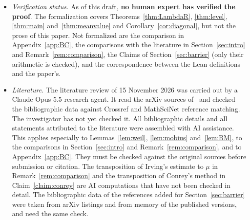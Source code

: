 \documentclass[11pt]{amsart}
\theoremstyle{definition}
\theoremstyle{remark}
\numberwithin{equation}{section}
\begin{document}
\begin{itemize}
November 2026, and \texttt{Barrier.lean} by Claude Fable 5.2 on the same
day; all of it is checked by the Lean kernel.  It imports Lean Pool and
PNT+.  Lean Pool's Kloosterman--Weil development states that generative AI
contributed substantially to it.  Machine checking guarantees that the
formal theorem follows from the formal definitions.  It does not guarantee
that those definitions match the mathematics; that correspondence still
requires human review.
\item \emph{Verification status.}  As of this draft, \textbf{no human
expert has verified the proof}.  The formalization covers
Theorems~\ref{thm:LambdaR}, \ref{thm:level}, \ref{thm:main}
and~\ref{thm:meanvalue} and Corollary~\ref{cor:diagonal}, but not the prose
of this paper.  Not formalized are the comparison in
Appendix~\ref{app:BC}, the comparisons with the literature in
Section~\ref{sec:intro} and Remark~\ref{rem:comparison}, the Claims of
Section~\ref{sec:barrier} (only their arithmetic is checked), and the
correspondence between the Lean definitions and the paper's.
\item \emph{Literature.}  The literature review of 15 November 2026 was
carried out by a Claude Opus 5.5 research agent.  It read the arXiv sources
of~\cite{Walker,Irv14,BCR,PR18,FR22} and checked the bibliographic data
against Crossref and MathSciNet reference matching.  The investigator has not
yet checked it.  All bibliographic details and all statements attributed to
the literature were assembled with AI assistance.  This applies especially
to Lemmas~\ref{lem:weil}, \ref{lem:mobius} and~\ref{lem:BM}, to the
comparisons in Section~\ref{sec:intro} and Remark~\ref{rem:comparison}, and
to Appendix~\ref{app:BC}.  They must be checked against the original sources
before submission or citation.  The transposition of Irving's estimate to
$\mu$ in Remark~\ref{rem:comparison} and the transposition of Conrey's
method in Claim~\ref{claim:conrey} are AI computations that have not been
checked in detail.  The bibliographic data of the references added for
Section~\ref{sec:barrier} were taken from arXiv listings and from memory of
the published versions, and need the same check.
\end{itemize}
\end{document}
